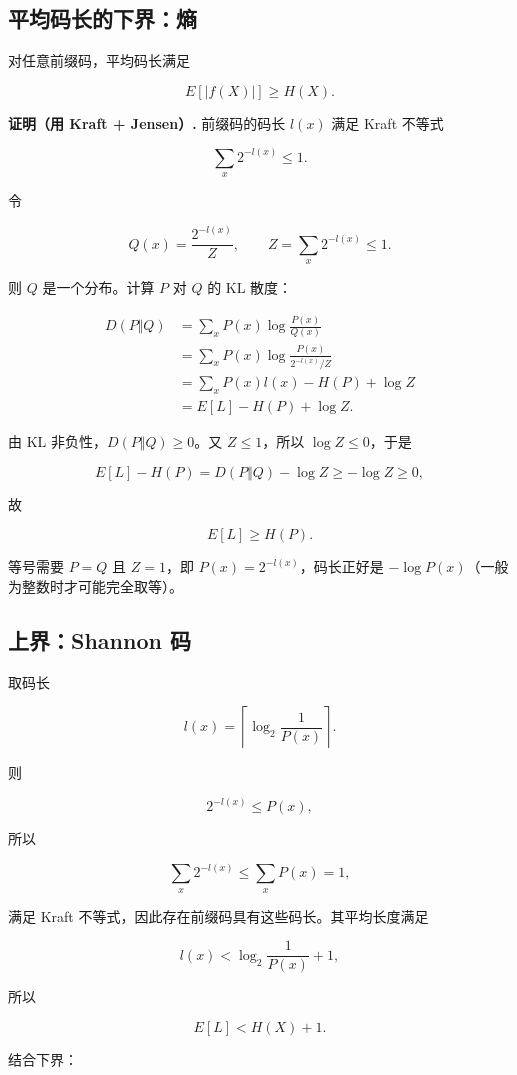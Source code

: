 \subsection{平均码长的下界：熵}


对任意前缀码，平均码长满足

\[
\boxed{
E[|f(X)|]\ge H(X)
}.
\]

\textbf{证明（用 Kraft + Jensen）.} 前缀码的码长 $l(x)$ 满足 Kraft 不等式

\[
\sum_{x}2^{-l(x)}\le1.
\]

令

\[
Q(x)=\frac{2^{-l(x)}}{Z},\qquad
Z=\sum_x2^{-l(x)}\le1.
\]

则 $Q$ 是一个分布。计算 $P$ 对 $Q$ 的 KL 散度：

\[
\begin{aligned}
D(P\Vert Q)
&=\sum_xP(x)\log\frac{P(x)}{Q(x)}\\
&=\sum_xP(x)\log\frac{P(x)}{2^{-l(x)}/Z}\\
&=\sum_xP(x)l(x)-H(P)+\log Z\\
&=E[L]-H(P)+\log Z.
\end{aligned}
\]

由 KL 非负性，$D(P\Vert Q)\ge0$。又 $Z\le1$，所以 $\log Z\le0$，于是

\[
E[L]-H(P)
=D(P\Vert Q)-\log Z
\ge -\log Z\ge0,
\]

故

\[
E[L]\ge H(P).
\]

等号需要 $P=Q$ 且 $Z=1$，即 $P(x)=2^{-l(x)}$，码长正好是 $-\log P(x)$（一般为整数时才可能完全取等）。

\subsection{上界：Shannon 码}


取码长

\[
l(x)=\left\lceil\log_2\frac1{P(x)}\right\rceil.
\]

则

\[
2^{-l(x)}\le P(x),
\]

所以

\[
\sum_x2^{-l(x)}\le\sum_xP(x)=1,
\]

满足 Kraft 不等式，因此存在前缀码具有这些码长。其平均长度满足

\[
l(x)<\log_2\frac1{P(x)}+1,
\]

所以

\[
E[L]<H(X)+1.
\]

结合下界：

